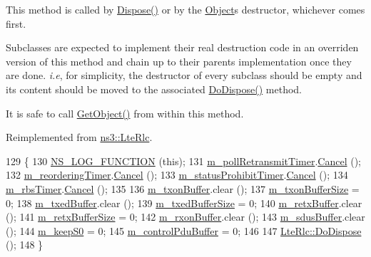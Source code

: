 This method is called by \hyperlink{classns3_1_1Object_aa90ae598863f6c251cdab3c3722afdaf}{Dispose()} or by the \hyperlink{classns3_1_1Object}{Object}\textquotesingle{}s destructor, whichever comes first.

Subclasses are expected to implement their real destruction code in an overriden version of this method and chain up to their parent\textquotesingle{}s implementation once they are done. {\itshape i.\+e}, for simplicity, the destructor of every subclass should be empty and its content should be moved to the associated \hyperlink{classns3_1_1LteRlcAm_a4feb3735466918c203800a129554173c}{Do\+Dispose()} method.

It is safe to call \hyperlink{classns3_1_1Object_a13e18c00017096c8381eb651d5bd0783}{Get\+Object()} from within this method. 

Reimplemented from \hyperlink{classns3_1_1LteRlc_a6abc1e07937a04aabd869fedcc43371e}{ns3\+::\+Lte\+Rlc}.


\begin{DoxyCode}
129 \{
130   \hyperlink{log-macros-disabled_8h_a90b90d5bad1f39cb1b64923ea94c0761}{NS\_LOG\_FUNCTION} (\textcolor{keyword}{this});
131   \hyperlink{classns3_1_1LteRlcAm_a9b34f6f4c6993ae026b95be1f63aacfa}{m\_pollRetransmitTimer}.\hyperlink{classns3_1_1EventId_a993ae94e48e014e1afd47edb16db7a11}{Cancel} ();
132   \hyperlink{classns3_1_1LteRlcAm_adfc371376cf9dc771d2b2736be16550c}{m\_reorderingTimer}.\hyperlink{classns3_1_1EventId_a993ae94e48e014e1afd47edb16db7a11}{Cancel} ();
133   \hyperlink{classns3_1_1LteRlcAm_af32da019a7f906fd00bba0f15927817a}{m\_statusProhibitTimer}.\hyperlink{classns3_1_1EventId_a993ae94e48e014e1afd47edb16db7a11}{Cancel} ();
134   \hyperlink{classns3_1_1LteRlcAm_a6c9e3ac7026e952b3e2e48da74a5bf4b}{m\_rbsTimer}.\hyperlink{classns3_1_1EventId_a993ae94e48e014e1afd47edb16db7a11}{Cancel} ();
135 
136   \hyperlink{classns3_1_1LteRlcAm_ad8ba4549a7c78cfe0e528d2e9cc465f8}{m\_txonBuffer}.clear ();
137   \hyperlink{classns3_1_1LteRlcAm_a3e8db6b5bc1d3fcc215d554e8d347eda}{m\_txonBufferSize} = 0;
138   \hyperlink{classns3_1_1LteRlcAm_afabb45c6de7da492347b45c139de0c28}{m\_txedBuffer}.clear ();
139   \hyperlink{classns3_1_1LteRlcAm_add3fe05a0fd3a4ad1fcb7db0239c698f}{m\_txedBufferSize} = 0;
140   \hyperlink{classns3_1_1LteRlcAm_ab34bb5fce080a41395ad7ea5789af8d0}{m\_retxBuffer}.clear ();
141   \hyperlink{classns3_1_1LteRlcAm_af270916ffd1805b027a7b9cc05c91e7d}{m\_retxBufferSize} = 0;
142   \hyperlink{classns3_1_1LteRlcAm_a7442b4f97fccd0c393dd9f27325a853a}{m\_rxonBuffer}.clear ();
143   \hyperlink{classns3_1_1LteRlcAm_abd47ae50bcc975615b87dd53d86efd8e}{m\_sdusBuffer}.clear ();
144   \hyperlink{classns3_1_1LteRlcAm_a32d671b1f6b5cb53b34c93169ad51808}{m\_keepS0} = 0;
145   \hyperlink{classns3_1_1LteRlcAm_a735a20f26634b44104176445de24d995}{m\_controlPduBuffer} = 0;
146 
147   \hyperlink{classns3_1_1LteRlc_a6abc1e07937a04aabd869fedcc43371e}{LteRlc::DoDispose} ();
148 \}
\end{DoxyCode}


